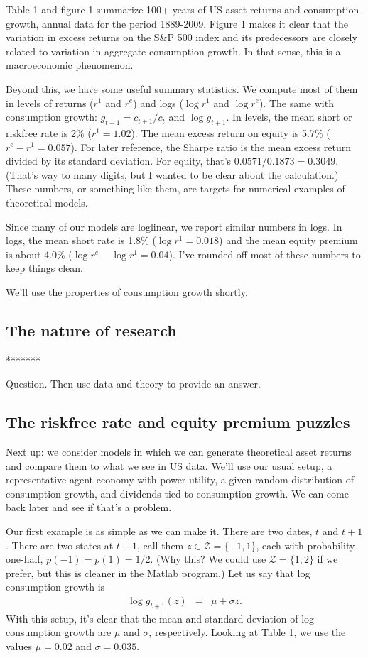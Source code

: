 \documentclass[11pt]{article}
\begin{document}
Table 1 and figure 1 summarize 100+ years of US asset returns and consumption
growth,
annual data for the period 1889-2009.
Figure 1 makes it clear that the variation in excess returns on the S\&P 500 index
and its predecessors
are closely related to variation in aggregate consumption growth.
In that sense, this is a macroeconomic phenomenon.

Beyond this, we have some useful summary statistics.
We compute most of them in levels of returns ($r^1$ and $r^e$)
and logs ($\log r^1$ and $\log r^e$).
The same with consumption growth:  $g_{t+1} = c_{t+1}/c_t$
and $\log g_{t+1}$.
In levels, the mean short or riskfree rate is 2\% ($r^1 = 1.02$).
The mean excess return on equity is 5.7\% ($r^e - r^1 = 0.057$).
For later reference, the Sharpe ratio is the mean excess return divided
by its standard deviation.
For equity, that's $ 0.0571/0.1873 = 0.3049$.
(That's way to many digits, but I wanted to be clear about the calculation.)
These numbers, or something like them, are targets for numerical examples
of theoretical models.

Since many of our models are loglinear, we report similar numbers in logs.
In logs, the mean short rate is 1.8\% ($\log r^1 = 0.018$)
and the mean equity premium is about 4.0\% ($\log r^e - \log r^1 = 0.04$).
I've rounded off most of these numbers to keep things clean.

We'll use the properties of consumption growth shortly.

\subsection*{The nature of research}

*******

Question.  Then use data and theory to provide an answer.  


\subsection*{The riskfree rate and equity premium puzzles}

Next up:  we consider models in which we can generate theoretical asset returns
and compare them to what we see in US data.
We'll use our usual setup, a representative agent economy
with power utility, a given random distribution of consumption
growth, and dividends tied to consumption growth.
We can come back later and see if that's a problem.

Our first example is as simple as we can make it.
There are two dates, $t$ and $t+1$.
There are two states at $t+1$, call them $ z \in \mathcal{Z} = \{-1, 1\}$,
each with probability one-half, $p(-1) = p(1) = 1/2$.
(Why this?  We could use $\mathcal{Z} = \{1,2\}$ if we prefer, but this is cleaner
in the Matlab program.)
Let us say that log consumption growth is
\begin{eqnarray*}
    \log g_{t+1}(z) &=& \mu + \sigma z .
\end{eqnarray*}
With this setup, it's clear that the mean and standard deviation of log consumption growth
are $\mu$ and $\sigma$, respectively.
Looking at Table 1, we use the values $\mu = 0.02$ and $\sigma = 0.035$.
\end{document}
